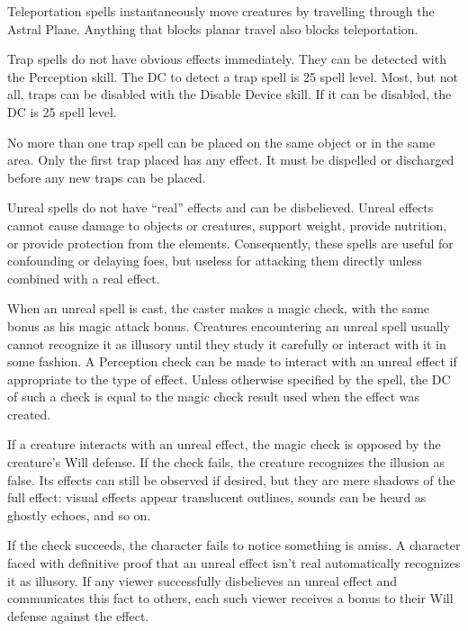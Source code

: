 \begin{itemize*}
\item Teleportation spells instantaneously move creatures by travelling through the Astral Plane. Anything that blocks planar travel also blocks teleportation.
\item Trap spells do not have obvious effects immediately. They can be detected with the Perception skill. The DC to detect a trap spell is 25 \add spell level. Most, but not all, traps can be disabled with the Disable Device skill. If it can be disabled, the DC is 25 \add spell level.
\par No more than one trap spell can be placed on the same object or in the same area. Only the first trap placed has any effect. It must be dispelled or discharged before any new traps can be placed.
\item Unreal spells do not have ``real'' effects and can be disbelieved. Unreal effects cannot cause damage to objects or creatures, support weight, provide nutrition, or provide protection from the elements. Consequently, these spells are useful for confounding or delaying foes, but useless for attacking them directly unless combined with a real effect.
\par When an unreal spell is cast, the caster makes a magic check, with the same bonus as his magic attack bonus. Creatures encountering an unreal spell usually cannot recognize it as illusory until they study it carefully or interact with it in some fashion. A Perception check can be made to interact with an unreal effect if appropriate to the type of effect. Unless otherwise specified by the spell, the DC of such a check is equal to the magic check result used when the effect was created.
\par If a creature interacts with an unreal effect, the magic check is opposed by the creature's Will defense. If the check fails, the creature recognizes the illusion as false. Its effects can still be observed if desired, but they are mere shadows of the full effect: visual effects appear translucent outlines, sounds can be heard as ghostly echoes, and so on.
\par If the check succeeds, the character fails to notice something is amiss. A character faced with definitive proof that an unreal effect isn't real automatically recognizes it as illusory. If any viewer successfully disbelieves an unreal effect and communicates this fact to others, each such viewer receives a  bonus to their Will defense against the effect.
\end{itemize*}

